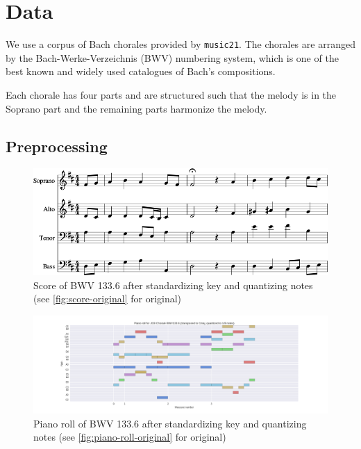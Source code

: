 \chapter{Data}

We use a corpus of Bach chorales provided by \texttt{music21}. The chorales are
arranged by the Bach-Werke-Verzeichnis (BWV) numbering system, which is one of
the best known and widely used catalogues of Bach's compositions.

Each chorale has four parts and are structured such that the melody is in
the Soprano part and the remaining parts harmonize the melody.

\section{Preprocessing}

\begin{figure}[htpb]
    \centering
    \includegraphics[width=1.0\linewidth]{Figures/bwv133-6-preproc-score-1.png}
    \caption{Score of BWV 133.6 after standardizing key and quantizing
    notes (see \autoref{fig:score-original} for original)}
    \label{fig:score-preproc}
\end{figure}

\begin{figure}[htpb]
    \centering
    \includegraphics[width=1.0\linewidth]{Figures/bwv133-6-preproc-piano-roll.png}
    \caption{Piano roll of BWV 133.6 after standardizing key and quantizing
    notes (see \autoref{fig:piano-roll-original} for original)}
    \label{fig:piano-roll-preproc}
\end{figure}

